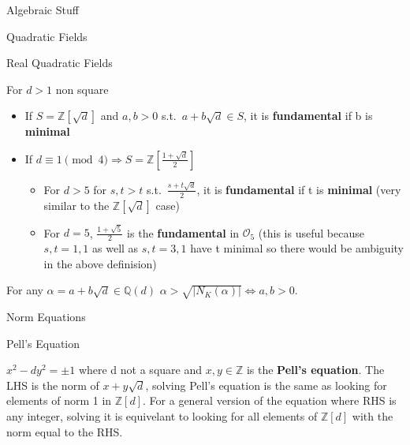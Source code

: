 \documentclass[12pt, letterpaper]{article}
\newcommand{\Q}{\mathbb{Q}}
\newcommand{\Z}{\mathbb{Z}}
\newcommand{\Ok}{\mathcal{O}}
\begin{document}
\begin{section}{Algebraic Stuff}
\begin{subsection}{Quadratic Fields}
  \end{subsection}

  \begin{subsection}{Real Quadratic Fields}

    For \(d > 1\) non square
    \begin{itemize}
      \item If \(S = \Z[\sqrt{d}]\) and \(a, b > 0\) s.t.\ \(a + b
            \sqrt{d} \in S\), it is \textbf{fundamental} if b is
            \textbf{minimal}
      \item If \(d \equiv 1 \pmod{4} \Rightarrow S =
            \Z[\frac{1 + \sqrt{d}}{2}]\)
            \begin{itemize}
              \item For \(d > 5\) for \(s, t > t\) s.t.\ \(\frac{s + t
                    \sqrt{d}}{2}\), it is \textbf{fundamental} if t is
                    \textbf{minimal} (very similar to the
                    \(\Z[\sqrt{d}]\) case)
              \item For \(d = 5\), \(\frac{1 + \sqrt{5}}{2}\) is the
                    \textbf{fundamental} in \(\Ok_{5}\)
                    (this is useful because \(s, t = 1, 1\) as well as
                    \(s, t = 3, 1\) have t minimal so there would be ambiguity
                    in the above definision)
            \end{itemize}
    \end{itemize}

    For any \(\alpha = a + b \sqrt{d} \in \Q(d)\) \(\alpha >
    \sqrt{| N_{K}(\alpha) |} \iff a, b > 0\).

    \end{subsection}

  \begin{subsection}{Norm Equations}

    \begin{subsubsection}{Pell's Equation}

      \(x^{2} - dy^{2} = \pm 1\) where d not a square and \(x, y \in
      \Z\) is the \textbf{Pell's equation}. The LHS is the norm of
      \(x + y \sqrt{d}\), solving Pell's equation is the same as looking for
      elements of norm 1 in \(\Z[d]\). For a general version of the
      equation where RHS is any integer, solving it is equivelant to looking
      for all elements of \(\Z[d]\) with the norm equal to the RHS.

    \end{subsubsection}


\end{subsection}
\end{section}
\end{document}
